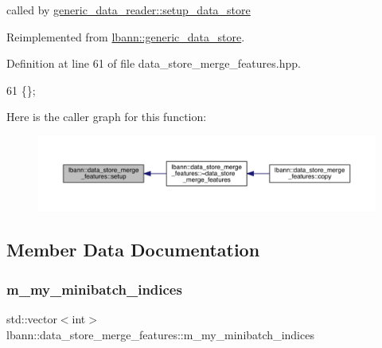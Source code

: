 called by \hyperlink{classlbann_1_1generic__data__reader_a8b2a09d38512fc11f1b9d572c89100a7}{generic\+\_\+data\+\_\+reader\+::setup\+\_\+data\+\_\+store} 



Reimplemented from \hyperlink{classlbann_1_1generic__data__store_a1cff17def02ee21b6ca0befeb04bb582}{lbann\+::generic\+\_\+data\+\_\+store}.



Definition at line 61 of file data\+\_\+store\+\_\+merge\+\_\+features.\+hpp.


\begin{DoxyCode}
61 \{\};
\end{DoxyCode}
Here is the caller graph for this function\+:\nopagebreak
\begin{figure}[H]
\begin{center}
\leavevmode
\includegraphics[width=350pt]{classlbann_1_1data__store__merge__features_aecb1fbbbc0c0ee9647cf178487eb2c02_icgraph}
\end{center}
\end{figure}


\subsection{Member Data Documentation}
\mbox{\label{classlbann_1_1data__store__merge__features_adb33a14f6b49ff16a217bcb30d3f0e1b}} 
\subsubsection{\texorpdfstring{m\+\_\+my\+\_\+minibatch\+\_\+indices}{m\_my\_minibatch\_indices}}
{\footnotesize\ttfamily std\+::vector$<$int$>$ lbann\+::data\+\_\+store\+\_\+merge\+\_\+features\+::m\+\_\+my\+\_\+minibatch\+\_\+indices\hspace{0.3cm}{\ttfamily [protected]}}

